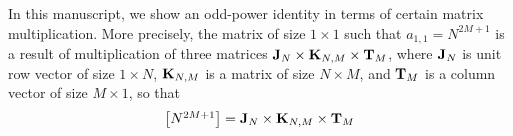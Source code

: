In this manuscript, we show an odd-power identity in terms of certain matrix multiplication.
More precisely, the matrix of size $1 \times 1$ such that $a_{1,1} = N^{2M+1}$ is a result of
multiplication of three matrices ${\mathbf{J}} \sb{N} \times {\mathbf{K}} \sb{N, M} \times {\mathbf{T}} \sb{M}$, where
${\mathbf{J}} \sb{N}$ is unit row vector of size $1 \times N$, ${\mathbf{K}} \sb{N, M}$ is a matrix of size $N \times M$,
and ${\mathbf{T}} \sb{M}$ is a column vector of size $M \times 1$, so that
\[
    \begin{bmatrix}
        N^{2M+1}
    \end{bmatrix} = {\mathbf{J}} \sb{N} \times {\mathbf{K}} \sb{N, M} \times {\mathbf{T}} \sb{M}
\]
